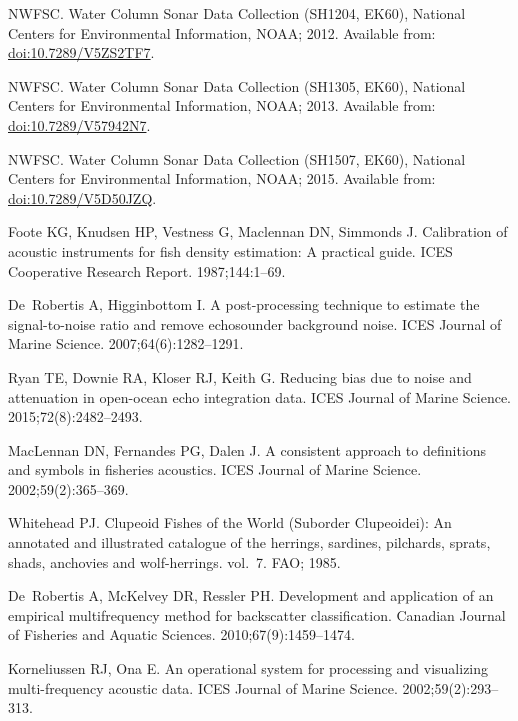 \documentclass[10pt,letterpaper]{article}
\begin{document}
\begin{thebibliography}{10}
NWFSC. Water Column Sonar Data Collection (SH1204, EK60), National Centers for
  Environmental Information, NOAA; 2012.
\newblock Available from: \url{doi:10.7289/V5ZS2TF7}.

NWFSC. Water Column Sonar Data Collection (SH1305, EK60), National Centers for
  Environmental Information, NOAA; 2013.
\newblock Available from: \url{doi:10.7289/V57942N7}.

NWFSC. Water Column Sonar Data Collection (SH1507, EK60), National Centers for
  Environmental Information, NOAA; 2015.
\newblock Available from: \url{doi:10.7289/V5D50JZQ}.

Foote KG, Knudsen HP, Vestness G, Maclennan DN, Simmonds J.
\newblock Calibration of acoustic instruments for fish density estimation: A
  practical guide.
\newblock ICES Cooperative Research Report. 1987;144:1--69.

De~Robertis A, Higginbottom I.
\newblock A post-processing technique to estimate the signal-to-noise ratio and
  remove echosounder background noise.
\newblock ICES Journal of Marine Science. 2007;64(6):1282--1291.

Ryan TE, Downie RA, Kloser RJ, Keith G.
\newblock Reducing bias due to noise and attenuation in open-ocean echo
  integration data.
\newblock ICES Journal of Marine Science. 2015;72(8):2482--2493.

MacLennan DN, Fernandes PG, Dalen J.
\newblock A consistent approach to definitions and symbols in fisheries
  acoustics.
\newblock ICES Journal of Marine Science. 2002;59(2):365--369.

Whitehead PJ.
\newblock Clupeoid Fishes of the World (Suborder Clupeoidei): An annotated and
  illustrated catalogue of the herrings, sardines, pilchards, sprats, shads,
  anchovies and wolf-herrings. vol.~7.
\newblock FAO; 1985.

De~Robertis A, McKelvey DR, Ressler PH.
\newblock Development and application of an empirical multifrequency method for
  backscatter classification.
\newblock Canadian Journal of Fisheries and Aquatic Sciences.
  2010;67(9):1459--1474.

Korneliussen RJ, Ona E.
\newblock An operational system for processing and visualizing multi-frequency
  acoustic data.
\newblock ICES Journal of Marine Science. 2002;59(2):293--313.


\end{thebibliography}
\end{document}
